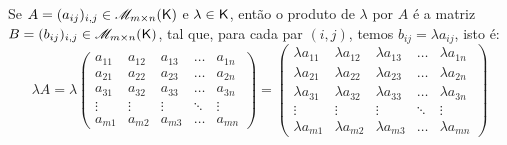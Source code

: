\documentclass[10pt,a4paper]{book}
\begin{document}
\begin{definition} 
	Se $A = (a_{ij})_{i,j} \in \mathscr{ M }_{m \times n}(\mathsf{ K })$ e $\lambda \in \mathsf{ K }$, então o produto de $\lambda$ por $A$ é a matriz $B  = (b_{ij})_{i,j} \in \mathscr{ M }_{m \times n}(\mathsf{ K })$, tal que, para cada par $(i, j)$, temos $b_{ij} = \lambda a_{ij}$, isto é:
	\[
		\lambda A = 
		\lambda
		\left(\begin{array}{ccccc}
			a_{11} & a_{12} & a_{13} &  \dots & a_{1n} \\
			a_{21} & a_{22} & a_{23} &  \dots & a_{2n} \\
			a_{31} & a_{32} & a_{33} &  \dots & a_{3n} \\
			\vdots & \vdots & \vdots & \ddots & \vdots \\
			a_{m1} & a_{m2} & a_{m3} &  \dots & a_{mn} 
		\end{array}\right)
		=
		\left(\begin{array}{ccccc}
			\lambda a_{11} & \lambda a_{12} & \lambda a_{13} &  \dots & \lambda a_{1n} \\
			\lambda a_{21} & \lambda a_{22} & \lambda a_{23} &  \dots & \lambda a_{2n} \\
			\lambda a_{31} & \lambda a_{32} & \lambda a_{33} &  \dots & \lambda a_{3n} \\
			\vdots & \vdots & \vdots & \ddots & \vdots \\
			\lambda a_{m1} & \lambda a_{m2} & \lambda a_{m3} &  \dots & \lambda a_{mn} 
		\end{array}\right)
	\]
\end{definition}
\end{document}
